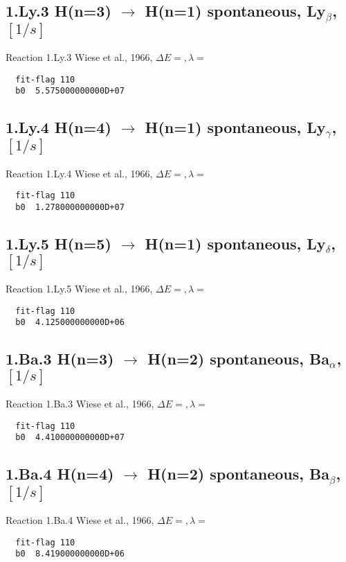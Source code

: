 \documentclass[12pt]{article}
\begin{document}
\subsection{
1.Ly.3   H(n=3) $\rightarrow$ H(n=1) spontaneous,  Ly$_\beta$, $[1/s]$
}
Reaction 1.Ly.3
Wiese et al., 1966, $\Delta E=     ,\lambda=  $
\begin{small}\begin{verbatim}
  fit-flag 110
  b0  5.575000000000D+07
\end{verbatim}\end{small}
\subsection{
1.Ly.4    H(n=4) $\rightarrow$ H(n=1) spontaneous,  Ly$_\gamma$, $[1/s]$
}
Reaction 1.Ly.4
Wiese et al., 1966, $\Delta E=     ,\lambda=  $
\begin{small}\begin{verbatim}
  fit-flag 110
  b0  1.278000000000D+07
\end{verbatim}\end{small}
\subsection{
1.Ly.5    H(n=5) $\rightarrow$ H(n=1) spontaneous,  Ly$_\delta$, $[1/s]$
}
Reaction 1.Ly.5 
Wiese et al., 1966, $\Delta E=     ,\lambda=  $
\begin{small}\begin{verbatim}
  fit-flag 110
  b0  4.125000000000D+06
\end{verbatim}\end{small}
\newpage
\subsection{
1.Ba.3    H(n=3) $\rightarrow$ H(n=2) spontaneous,  Ba$_\alpha$, $[1/s]$
}
Reaction 1.Ba.3
Wiese et al., 1966, $\Delta E=     ,\lambda=  $
\begin{small}\begin{verbatim}
  fit-flag 110
  b0  4.410000000000D+07
\end{verbatim}\end{small}

\subsection{
1.Ba.4    H(n=4) $\rightarrow$ H(n=2) spontaneous,  Ba$_\beta$, $[1/s]$
}
Reaction 1.Ba.4 
Wiese et al., 1966, $\Delta E=     ,\lambda=  $
\begin{small}\begin{verbatim}
  fit-flag 110
  b0  8.419000000000D+06
\end{verbatim}\end{small}
\end{document}

